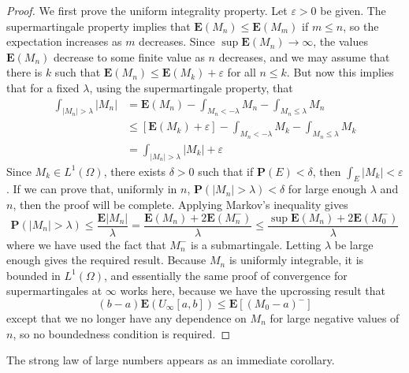 \begin{proof}
    We first prove the uniform integrality property. Let $\varepsilon > 0$ be given. The supermartingale property implies that $\mathbf{E}(M_n) \leq \mathbf{E}(M_m)$ if $m \leq n$, so the expectation increases as $m$ decreases. Since $\sup \mathbf{E}(M_n) \to \infty$, the values $\mathbf{E}(M_n)$ decrease to some finite value as $n$ decreases, and we may assume that there is $k$ such that $\mathbf{E}(M_n) \leq \mathbf{E}(M_k) + \varepsilon$ for all $n \leq k$. But now this implies that for a fixed $\lambda$, using the supermartingale property, that
    \begin{align*}
        \int_{|M_n| > \lambda} |M_n| &= \mathbf{E}(M_n) - \int_{M_n < -\lambda} M_n - \int_{M_n \leq \lambda} M_n\\
        &\leq [\mathbf{E}(M_k) + \varepsilon] - \int_{M_n < -\lambda} M_k - \int_{M_n \leq \lambda} M_k\\
        &= \int_{|M_n| > \lambda} |M_k| + \varepsilon
    \end{align*}
    Since $M_k \in L^1(\Omega)$, there exists $\delta > 0$ such that if $\mathbf{P}(E) < \delta$, then $\int_E |M_k| < \varepsilon$. If we can prove that, uniformly in $n$, $\mathbf{P}(|M_n| > \lambda) < \delta$ for large enough $\lambda$ and $n$, then the proof will be complete. Applying Markov's inequality gives
    \[ \mathbf{P}(|M_n| > \lambda) \leq \frac{\mathbf{E}|M_n|}{\lambda} = \frac{\mathbf{E}(M_n) + 2\mathbf{E}(M_n^-)}{\lambda} \leq \frac{\sup \mathbf{E}(M_n) + 2 \mathbf{E}(M_0^-)}{\lambda} \]
    where we have used the fact that $M_n^-$ is a submartingale. Letting $\lambda$ be large enough gives the required result. Because $M_n$ is uniformly integrable, it is bounded in $L^1(\Omega)$, and essentially the same proof of convergence for supermartingales at $\infty$ works here, because we have the upcrossing result that
    \[ (b - a)\mathbf{E}(U_\infty[a,b]) \leq \mathbf{E}[(M_0 - a)^-] \]
    except that we no longer have any dependence on $M_n$ for large negative values of $n$, so no boundedness condition is required.
\end{proof}

The strong law of large numbers appears as an immediate corollary.


